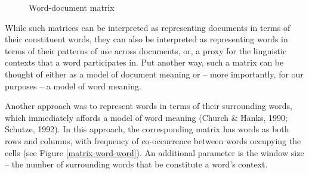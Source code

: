 \documentclass[man,floatsintext]{apa6}
\begin{document}
\begin{figure}
  \begin{center}
    \footnotesize{}
  \end{center}
  \caption{Word-document matrix}
  \label{matrix-word-doc}
\end{figure}

While such matrices can be interpreted as representing documents in
terms of their constituent words, they can also be interpreted as
representing words in terms of their patterns of use across documents,
or, a proxy for the linguistic contexts that a word participates
in. Put another way, such a matrix can be thought of either as a model
of document meaning or -- more importantly, for our purposes -- a
model of word meaning.

Another approach was to represent words in terms of their surrounding
words, which immediately affords a model of word meaning (Church \&
Hanks, 1990; Schutze, 1992). In this approach, the corresponding
matrix has words as both rows and columns, with frequency of
co-occurrence between words occupying the cells (see Figure
\ref{matrix-word-word}). An additional parameter is the window size --
the number of surrounding words that be constitute a word's context.
\end{document}
